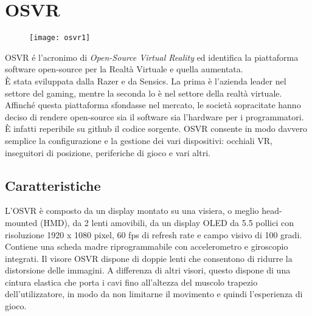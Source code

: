 \section{OSVR}
\begin{figure}[htb]
    \centering
    \vspace{-0.7cm}
    \texttt{[image: osvr1]}
    \vspace{-1cm}
\end{figure}
\noindent OSVR é l'acronimo di \textit{Open-Source Virtual Reality} ed identifica la piattaforma software open-source per la Realtà Virtuale e quella aumentata. \\È stata sviluppata dalla Razer e da Sensics. La prima è l'azienda leader nel settore del gaming, mentre la seconda lo è nel settore della realtà virtuale. Affinché questa piattaforma sfondasse nel mercato, le società sopracitate hanno deciso di rendere open-source sia il software sia l'hardware per i programmatori. È infatti reperibile su github il codice sorgente. OSVR consente in modo davvero semplice la configurazione e la gestione dei vari dispositivi: occhiali VR, inseguitori di posizione, periferiche di gioco e vari altri. 

\subsection{Caratteristiche}
L'OSVR è composto da un display montato su una visiera, o meglio head-mounted (HMD), da 2 lenti amovibili, da un display OLED da 5.5 pollici con risoluzione 1920 x 1080 pixel, 60 fps di refresh rate e campo visivo di 100 gradi. Contiene una scheda madre riprogrammabile con accelerometro e giroscopio integrati. Il visore OSVR dispone di doppie lenti che consentono di ridurre la distorsione delle immagini. A differenza di altri visori, questo dispone di una cintura elastica che porta i cavi fino all'altezza del muscolo trapezio dell'utilizzatore, in modo da non limitarne il movimento e quindi l'esperienza di gioco.\newpage

